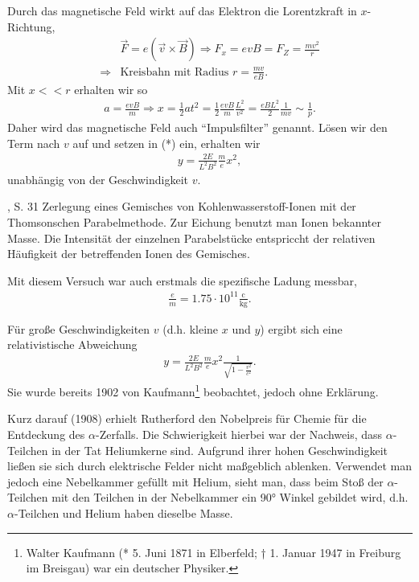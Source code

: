 Durch das magnetische Feld wirkt auf das Elektron die Lorentzkraft in
$x$-Richtung,
\begin{align*}
&\vec{F} = e(\vec{v}\times\vec{B}) \Rightarrow F_x = evB = F_Z =
\frac{mv^2}{r}\\
\Rightarrow & \text{Kreisbahn mit Radius } r=\frac{mv}{eB}.
\end{align*}
Mit $x<<r$ erhalten wir so
\begin{align*}
a = \frac{evB}{m} \Rightarrow x = \frac{1}{2}at^2 =
\frac{1}{2}\frac{evB}{m}\frac{L^2}{v^2} = \frac{eBL^2}{2}\frac{1}{mv} \sim
\frac{1}{p}.
\end{align*}
Daher wird das magnetische Feld auch ``Impulsfilter'' genannt. Lösen wir den
Term nach $v$ auf und setzen in (*) ein, erhalten wir
\begin{align*}
y = \frac{2E}{L^2B^2}\frac{m}{e}x^2,
\end{align*}
unabhängig von der Geschwindigkeit $v$.

%
	{\HakenWolf, S. 31}%
	{Zerlegung eines Gemisches von Kohlenwasserstoff-Ionen mit der Thomsonschen
	Parabelmethode. Zur Eichung benutzt man Ionen bekannter Masse. Die Intensität
	der einzelnen Parabelstücke entspriccht der relativen Häufigkeit der
	betreffenden Ionen des Gemisches.}

Mit diesem Versuch war auch erstmals die spezifische Ladung messbar,
\begin{align*}
\frac{e}{m} = 1.75\cdot 10^{11} \frac{\mathrm{c}}{\mathrm{kg}}.
\end{align*}

\begin{bemn}
Für große Geschwindigkeiten $v$ (d.h. kleine $x$ und $y$) ergibt sich eine
relativistische Abweichung
\begin{align*}
y = \frac{2E}{L^2B^2}\frac{m}{e}x^2\frac{1}{\sqrt{1-\frac{v^2}{c^2}}}.
\end{align*}
Sie wurde bereits 1902 von Kaufmann\footnote{Walter Kaufmann (* 5. Juni 1871
in Elberfeld; † 1. Januar 1947 in Freiburg im Breisgau) war ein deutscher
Physiker.} beobachtet, jedoch ohne Erklärung.\maphere
\end{bemn}

Kurz darauf (1908) erhielt Rutherford den Nobelpreis für Chemie für die
Entdeckung des $\alpha$-Zerfalls. Die Schwierigkeit hierbei war der Nachweis,
dass $\alpha$-Teilchen in der Tat Heliumkerne sind. Aufgrund ihrer hohen
Geschwindigkeit ließen sie sich durch elektrische Felder nicht maßgeblich
ablenken. Verwendet man jedoch eine Nebelkammer gefüllt mit Helium, sieht man,
dass beim Stoß der $\alpha$-Teilchen mit den Teilchen in der Nebelkammer ein
90° Winkel gebildet wird, d.h. $\alpha$-Teilchen und Helium haben dieselbe
Masse.


